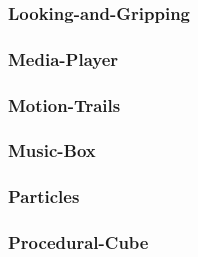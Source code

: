 \documentclass[a4paper]{article}
\begin{document}
\clearpage\subsubsection[Looking{}-and{}-Gripping]{Looking-and-Gripping}
\hypertarget{RefHeading23851167907073}{}\subsubsection{}
\clearpage\subsubsection[Media{}-Player]{Media-Player}
\hypertarget{RefHeading23871167907073}{}\subsubsection{}
\clearpage\subsubsection[Motion{}-Trails]{Motion-Trails}
\hypertarget{RefHeading23891167907073}{}\subsubsection{}
\clearpage\subsubsection[Music{}-Box]{Music-Box}
\hypertarget{RefHeading23911167907073}{}\subsubsection{}
\clearpage\subsubsection[Particles]{Particles}
\hypertarget{RefHeading23931167907073}{}\subsubsection{}
\clearpage\subsubsection[Procedural{}-Cube]{Procedural-Cube}
\hypertarget{RefHeading23951167907073}{}\subsubsection{}
\end{document}
